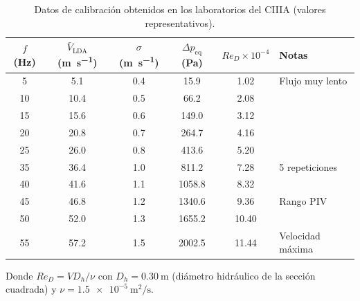 \documentclass[12pt,a4paper]{article}
\begin{document}
\begin{table}[H]
	\centering
	\caption{Datos de calibración obtenidos en los laboratorios del CIIIA
		(valores representativos).}
	\label{tab:calibracion}
	\begin{tabular}{SSSSSl}
		\toprule
		{$f$ (\si{\Hz})} & {$\bar{V}_\mathrm{LDA}$ (\si{\m\per\s})}
		                 & {$\sigma$ (\si{\m\per\s})}               & {$\Delta p_\mathrm{eq}$ (\si{\Pa})}
		                 & {$Re_D \times 10^{-4}$}                  & \textbf{Notas}                                                          \\
		                & 5.1                                      & 0.4                                 & 15.9   & 1.02  & Flujo muy lento  \\
		10               & 10.4                                     & 0.5                                 & 66.2   & 2.08  &                  \\
		15               & 15.6                                     & 0.6                                 & 149.0  & 3.12  &                  \\
		20               & 20.8                                     & 0.7                                 & 264.7  & 4.16  &                  \\
		25               & 26.0                                     & 0.8                                 & 413.6  & 5.20  &                  \\
		35               & 36.4                                     & 1.0                                 & 811.2  & 7.28  & 5 repeticiones   \\
		40               & 41.6                                     & 1.1                                 & 1058.8 & 8.32  &                  \\
		45               & 46.8                                     & 1.2                                 & 1340.6 & 9.36  & Rango PIV        \\
		50               & 52.0                                     & 1.3                                 & 1655.2 & 10.40 &                  \\
		55               & 57.2                                     & 1.5                                 & 2002.5 & 11.44 & Velocidad máxima \\
		\bottomrule
	\end{tabular}
\end{table}

Donde $Re_D = V D_h / \nu$ con $D_h = \SI{0.30}{\metre}$ (diámetro
hidráulico de la sección cuadrada) y
$\nu = \SI{1.5e-5}{\metre\squared\per\second}$.
\end{document}

